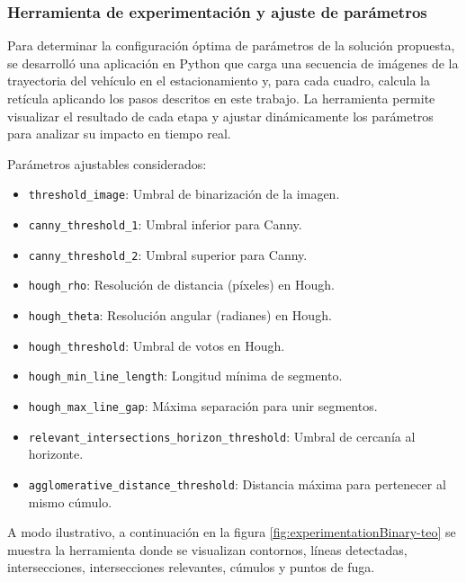 \subsubsection{Herramienta de experimentación y ajuste de parámetros}\label{sec:experimentation-tool}
\noindent
Para determinar la configuración óptima de parámetros de la solución propuesta, se desarrolló una aplicación en Python
que carga una secuencia de imágenes de la trayectoria del vehículo en el estacionamiento y, para cada cuadro,
calcula la retícula aplicando los pasos descritos en este trabajo. La herramienta permite visualizar el resultado de cada
etapa y ajustar dinámicamente los parámetros para analizar su impacto en tiempo real.

\noindent
Parámetros ajustables considerados:
\begin{itemize}
	\item \texttt{threshold\_image}: Umbral de binarización de la imagen.
	\item \texttt{canny\_threshold\_1}: Umbral inferior para Canny.
	\item \texttt{canny\_threshold\_2}: Umbral superior para Canny.
	\item \texttt{hough\_rho}: Resolución de distancia (píxeles) en Hough.
	\item \texttt{hough\_theta}: Resolución angular (radianes) en Hough.
	\item \texttt{hough\_threshold}: Umbral de votos en Hough.
	\item \texttt{hough\_min\_line\_length}: Longitud mínima de segmento.
	\item \texttt{hough\_max\_line\_gap}: Máxima separación para unir segmentos.
	\item \texttt{relevant\_intersections\_horizon\_threshold}: Umbral de cercanía al horizonte.
	\item \texttt{agglomerative\_distance\_threshold}: Distancia máxima para pertenecer al mismo cúmulo.
\end{itemize}

\noindent
A modo ilustrativo, a continuación  en la figura \ref{fig:experimentationBinary-teo} 
se muestra la herramienta donde se visualizan contornos, líneas detectadas,
intersecciones, intersecciones relevantes, cúmulos y puntos de fuga.

